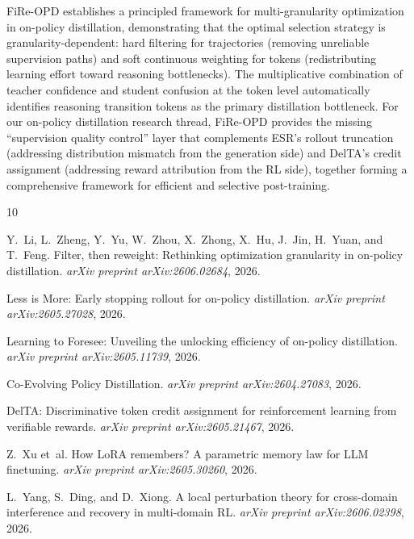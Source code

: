 \documentclass[11pt,a4paper]{article}
\begin{document}
FiRe-OPD establishes a principled framework for multi-granularity optimization in on-policy distillation, demonstrating that the optimal selection strategy is granularity-dependent: hard filtering for trajectories (removing unreliable supervision paths) and soft continuous weighting for tokens (redistributing learning effort toward reasoning bottlenecks). The multiplicative combination of teacher confidence and student confusion at the token level automatically identifies reasoning transition tokens as the primary distillation bottleneck. For our on-policy distillation research thread, FiRe-OPD provides the missing ``supervision quality control'' layer that complements ESR's rollout truncation (addressing distribution mismatch from the generation side) and DelTA's credit assignment (addressing reward attribution from the RL side), together forming a comprehensive framework for efficient and selective post-training.


\begin{thebibliography}{10}

Y.~Li, L.~Zheng, Y.~Yu, W.~Zhou, X.~Zhong, X.~Hu, J.~Jin, H.~Yuan, and T.~Feng.
\newblock Filter, then reweight: Rethinking optimization granularity in on-policy distillation.
\newblock \emph{arXiv preprint arXiv:2606.02684}, 2026.

Less is More: Early stopping rollout for on-policy distillation.
\newblock \emph{arXiv preprint arXiv:2605.27028}, 2026.

Learning to Foresee: Unveiling the unlocking efficiency of on-policy distillation.
\newblock \emph{arXiv preprint arXiv:2605.11739}, 2026.

Co-Evolving Policy Distillation.
\newblock \emph{arXiv preprint arXiv:2604.27083}, 2026.

DelTA: Discriminative token credit assignment for reinforcement learning from verifiable rewards.
\newblock \emph{arXiv preprint arXiv:2605.21467}, 2026.

Z.~Xu et~al.
\newblock How {LoRA} remembers? {A} parametric memory law for {LLM} finetuning.
\newblock \emph{arXiv preprint arXiv:2605.30260}, 2026.

L.~Yang, S.~Ding, and D.~Xiong.
\newblock A local perturbation theory for cross-domain interference and recovery in multi-domain {RL}.
\newblock \emph{arXiv preprint arXiv:2606.02398}, 2026.

\end{thebibliography}
\end{document}
